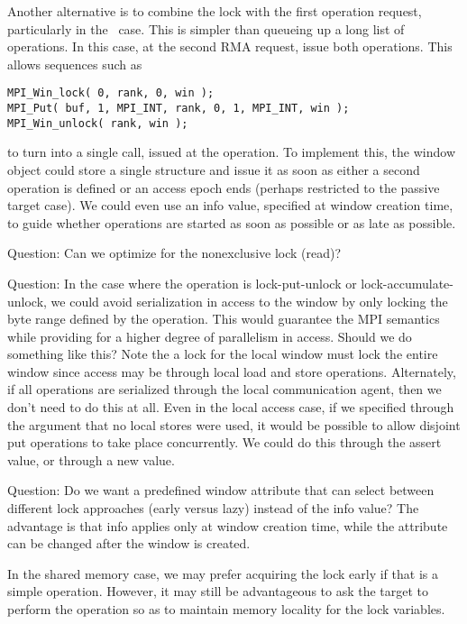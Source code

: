 \documentclass{article}
\begin{document}
Another alternative is to combine the lock with the first operation
request, particularly in the \tcpname\ case.  This is simpler than
queueing up a long list of operations.  In this case, at the second
RMA request, issue both operations.  This allows sequences such as
\begin{verbatim}
MPI_Win_lock( 0, rank, 0, win );
MPI_Put( buf, 1, MPI_INT, rank, 0, 1, MPI_INT, win );
MPI_Win_unlock( rank, win );
\end{verbatim}
to turn into a single  call, issued at the
 operation.  To implement this, the window
object could store a single  structure and
issue it as soon as either a second operation is defined or an access
epoch ends (perhaps restricted to the passive target case).  We could
even use an info value, specified at window creation time, to guide
whether operations are started as soon as possible or as late as possible.

Question: Can we optimize for the nonexclusive lock (read)?  

Question: In the case where the operation is lock-put-unlock or
lock-accumulate-unlock, we could avoid serialization in access to the window
by only locking the byte range defined by the operation.  This would guarantee
the MPI semantics while providing for a higher degree of parallelism in
access.  Should we do something like this?  Note the a lock for the local
window must lock the entire window since access may be through local
load and store operations.  Alternately, if all operations are serialized
through the local communication agent, then we don't need to do this at all.
Even in the local access case, if we specified through the 
argument that no local stores were used, it would be possible to allow
disjoint put operations to take place concurrently.  We could do this through
the  assert value, or through a new
 value.

Question: Do we want a predefined window attribute that can select between
different lock approaches (early versus lazy) instead of the info value?
The advantage is that info applies only at window creation time, while the
attribute can be changed after the window is created.

In the shared memory case, we may prefer acquiring the lock early if that is a
simple operation.  However, it may still be advantageous to ask the target to
perform the operation so as to maintain memory locality for the lock
variables.
\end{document}
